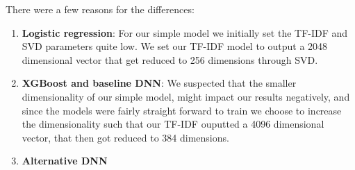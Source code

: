 There were a few reasons for the differences:
\begin{enumerate}
  \item \textbf{Logistic regression}: For our simple model we initially set the TF-IDF and SVD parameters quite low. We
    set our TF-IDF model to output a 2048 dimensional vector that get reduced to 256 dimensions through SVD.

  \item \textbf{XGBoost and baseline DNN}: We suspected that the smaller dimensionality of our simple model, might
    impact our results negatively, and since the models were fairly straight forward to train we choose to increase the
    dimensionality such that our TF-IDF ouputted a 4096 dimensional vector, that then got reduced to 384 dimensions.

  \item \textbf{Alternative DNN}
\end{enumerate}
